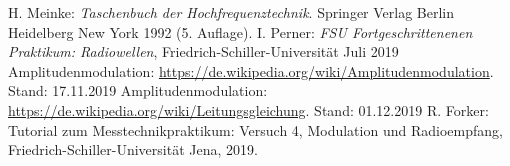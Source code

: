 \documentclass[a4paper,twoside,final]{article}
\begin{document}

\begin{thebibliography}{xxx}
	H. Meinke: \textit{Taschenbuch der Hochfrequenztechnik}. Springer Verlag Berlin Heidelberg New York 1992 (5. Auflage).
  I. Perner: \textit{FSU Fortgeschrittenenen Praktikum: Radiowellen}, Fried\-rich-Schil\-ler-Uni\-versi\-tät Juli 2019
  Amplitudenmodulation: \url{https://de.wikipedia.org/wiki/Amplitudenmodulation}. Stand: 17.11.2019
  Amplitudenmodulation: \url{https://de.wikipedia.org/wiki/Leitungsgleichung}. Stand: 01.12.2019
  R. Forker: Tutorial zum Messtechnikpraktikum: Versuch 4, Modulation und Radioempfang, Fried\-rich-Schil\-ler-Uni\-versi\-tät Jena, 2019.
\end{thebibliography}
\end{document}
